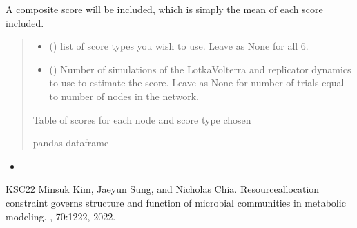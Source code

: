\documentclass[letterpaper,10pt,english]{sphinxmanual}
\begin{document}
\begin{fulllineitems}
\begin{fulllineitems}
\sphinxAtStartPar
A composite score will be included, which is simply the mean of each score included.
\begin{quote}\begin{description}
\begin{itemize}
\item {} 
\sphinxAtStartPar
{} () \textendash{} list of score types you wish to use. Leave as None for all 6.

\item {} 
\sphinxAtStartPar
{} () \textendash{} Number of simulations of the Lotka\sphinxhyphen{}Volterra and replicator dynamics to use to estimate the score. Leave as None for number of trials equal to number of nodes in the network.

\end{itemize}

\sphinxAtStartPar
Table of scores for each node and score type chosen

\sphinxAtStartPar
pandas dataframe

\end{description}\end{quote}

\sphinxAtStartPar
{}
\begin{itemize}
\item {} 
\sphinxAtStartPar
{\hyperref[\detokenize{friendlynets:friendlyNet.friendlyNet.NodeScores}]{}}

\end{itemize}

\end{fulllineitems}


\end{fulllineitems}


\begin{sphinxthebibliography}{KSC22}
\sphinxAtStartPar
Minsuk Kim, Jaeyun Sung, and Nicholas Chia. Resource\sphinxhyphen{}allocation constraint governs structure and function of microbial communities in metabolic modeling. , 70:12\textendash{}22, 2022.
\end{sphinxthebibliography}



\renewcommand{\indexname}{Index}
\printindex
\end{document}
